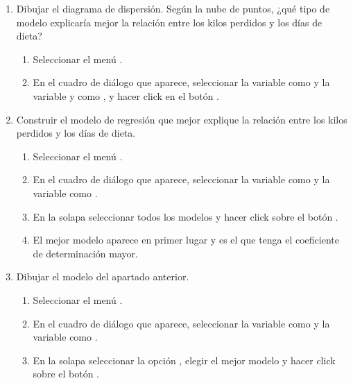 \begin{enumerate}[leftmargin=*]
\begin{enumerate}
\item Dibujar el diagrama de dispersión. 
Según la nube de puntos, ¿qué tipo de modelo explicaría mejor la relación entre los kilos perdidos y los días de dieta?
\begin{indicacion}{
\begin{enumerate}
\item Seleccionar el menú .
\item En el cuadro de diálogo que aparece, seleccionar la variable  como  y la variable
 y como , y hacer click en el botón .
\end{enumerate}}
\end{indicacion}

\item Construir el modelo de regresión que mejor explique la relación entre los kilos perdidos y los días de dieta.
\begin{indicacion}{
\begin{enumerate}
\item Seleccionar el menú .
\item En el cuadro de diálogo que aparece, seleccionar la variable  como 
y la variable  como .
\item En la solapa  seleccionar todos los modelos y hacer click sobre el botón .
\item El mejor modelo aparece en primer lugar y es el que tenga el coeficiente de determinación mayor.
\end{enumerate}}
\end{indicacion}

\item Dibujar el modelo del apartado anterior.
\begin{indicacion}{
\begin{enumerate}
\item Seleccionar el menú .
\item En el cuadro de diálogo que aparece, seleccionar la variable  como 
y la variable  como .
\item En la solapa  seleccionar la opción , elegir el mejor modelo y hacer click sobre el botón .
\end{enumerate}}
\end{indicacion}


\end{enumerate}
\end{enumerate}
